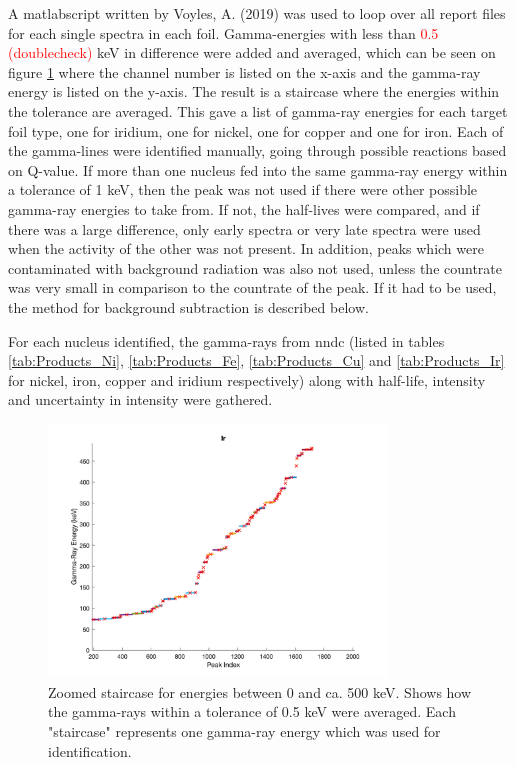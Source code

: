 A matlabscript written by Voyles, A. (2019) was used to loop over all report files for each single spectra in each foil. Gamma-energies with less than \textcolor{red}{0.5 (doublecheck)}  keV in difference were added and averaged, which can be seen on figure \ref{fig:Ir_staircase_gammas} where the channel number is listed on the x-axis and the gamma-ray energy is listed on the y-axis. The result is a staircase where the energies within the tolerance are averaged. This gave a list of gamma-ray energies for each target foil type, one for iridium, one for nickel, one for copper and one for iron. Each of the gamma-lines were identified manually, going through possible reactions based on Q-value. If more than one nucleus fed into the same gamma-ray energy within a tolerance of 1 keV, then the peak was not used if there were other possible gamma-ray energies to take from. If not, the half-lives were compared, and if there was a large difference, only early spectra or very late spectra were used when the activity of the other was not present. In addition, peaks which were contaminated with background radiation was also not used, unless the countrate was very small in comparison to the countrate of the peak. If it had to be used, the method for background subtraction is described below. 

For each nucleus identified, the gamma-rays from nndc (listed in tables \ref{tab:Products_Ni}, \ref{tab:Products_Fe}, \ref{tab:Products_Cu} and \ref{tab:Products_Ir} for nickel, iron, copper and iridium respectively) along with half-life, intensity and uncertainty in intensity were gathered. 

\begin{figure}
    \centering
    \includegraphics[width=0.8\textwidth]{Analysis/Ir_staircase_zoomed.png}
    \caption{Zoomed staircase for energies between 0 and ca. 500 keV.  Shows how the gamma-rays within  a tolerance of 0.5 keV were averaged. Each "staircase" represents one gamma-ray energy which was used for identification. }
    \label{fig:Ir_staircase_gammas}
\end{figure}

